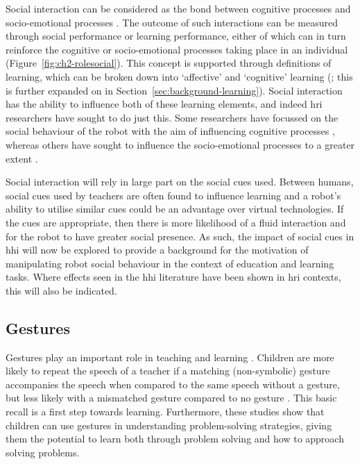 Social interaction can be considered as the bond between cognitive processes and socio-emotional processes \citep{kreijns2003identifying}. The outcome of such interactions can be measured through social performance or learning performance, either of which can in turn reinforce the cognitive or socio-emotional processes taking place in an individual (Figure~\ref{fig:ch2-rolesocial}). This concept is supported through definitions of learning, which can be broken down into `affective' and `cognitive' learning (\citealp{bloom1956taxonomy}; this is further expanded on in Section~\ref{sec:background-learning}). Social interaction has the ability to influence both of these learning elements, and indeed \acrshort{hri} researchers have sought to do just this. Some researchers have focussed on the social behaviour of the robot with the aim of influencing cognitive processes \citep{kennedy2015higher,szafir2012pay}, whereas others have sought to influence the socio-emotional processes to a greater extent \citep{castellano2013towards}. 

Social interaction will rely in large part on the social cues used. Between humans, social cues used by teachers are often found to influence learning and a robot's ability to utilise similar cues could be an advantage over virtual technologies. If the cues are appropriate, then there is more likelihood of a fluid interaction and for the robot to have greater social presence. As such, the impact of social cues in \acrshort{hhi} will now be explored to provide a background for the motivation of manipulating robot social behaviour in the context of education and learning tasks. Where effects seen in the \acrshort{hhi} literature have been shown in \acrshort{hri} contexts, this will also be indicated.

\subsection{Gestures} \label{sec:background-gesture}
Gestures play an important role in teaching and learning \citep{kelly2008gesture, macedonia2012gestures}. Children are more likely to repeat the speech of a teacher if a matching (non-symbolic) gesture accompanies the speech when compared to the same speech without a gesture, but less likely with a mismatched gesture compared to no gesture \citep{goldin2005our, goldin1999teacher}. This basic recall is a first step towards learning. Furthermore, these studies show that children can use gestures in understanding problem-solving strategies, giving them the potential to learn both through problem solving and how to approach solving problems.

